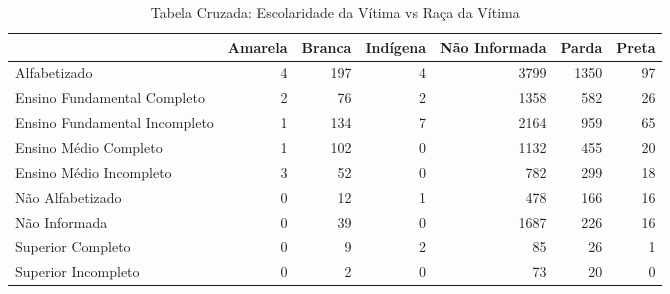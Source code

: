 \begin{table}[ht]
\centering
\begin{tabular}{lrrrrrr}
  \hline
 & Amarela & Branca & Indígena & Não Informada & Parda & Preta \\ 
  \hline
Alfabetizado &   4 & 197 &   4 & 3799 & 1350 &  97 \\ 
  Ensino Fundamental Completo &   2 &  76 &   2 & 1358 & 582 &  26 \\ 
  Ensino Fundamental Incompleto &   1 & 134 &   7 & 2164 & 959 &  65 \\ 
  Ensino Médio Completo &   1 & 102 &   0 & 1132 & 455 &  20 \\ 
  Ensino Médio Incompleto &   3 &  52 &   0 & 782 & 299 &  18 \\ 
  Não Alfabetizado &   0 &  12 &   1 & 478 & 166 &  16 \\ 
  Não Informada &   0 &  39 &   0 & 1687 & 226 &  16 \\ 
  Superior Completo &   0 &   9 &   2 &  85 &  26 &   1 \\ 
  Superior Incompleto &   0 &   2 &   0 &  73 &  20 &   0 \\ 
   \hline
\end{tabular}
\caption{Tabela Cruzada: Escolaridade da Vítima vs Raça da Vítima} 
\end{table}
